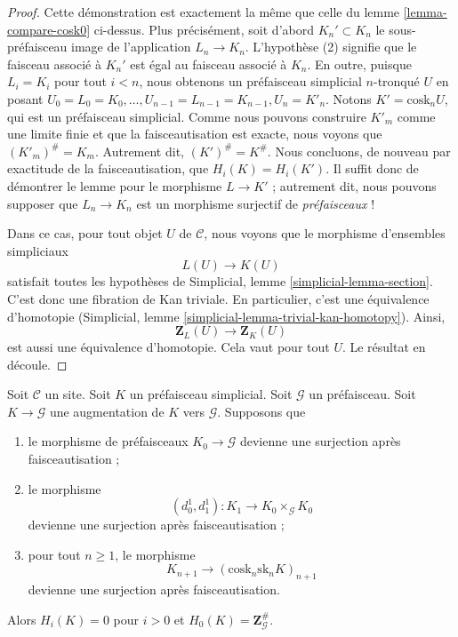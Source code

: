\begin{proof}
Cette démonstration est exactement la même que celle du
lemme \ref{lemma-compare-cosk0} ci-dessus. Plus précisément,
soit d'abord $K_n' \subset K_n$ le sous-préfaisceau
image de l'application $L_n \to K_n$. L'hypothèse
(2) signifie que le faisceau associé à $K_n'$ est égal au
faisceau associé à $K_n$. En outre, puisque $L_i = K_i$
pour tout $i < n$, nous obtenons un préfaisceau simplicial
$n$-tronqué $U$ en posant
$U_0 = L_0 = K_0, \ldots, U_{n - 1} = L_{n - 1} = K_{n - 1}, U_n = K'_n$.
Notons $K' = \text{cosk}_n U$, qui est un préfaisceau simplicial.
Comme nous pouvons construire $K'_m$ comme une limite finie et
que la faisceautisation est exacte, nous voyons que
$(K'_m)^\# = K_m$. Autrement dit, $(K')^\# = K^\#$.
Nous concluons, de nouveau par exactitude de la faisceautisation,
que $H_i(K) = H_i(K')$. Il suffit donc de démontrer le lemme
pour le morphisme $L \to K'$ ; autrement dit, nous pouvons
supposer que $L_n \to K_n$ est un morphisme surjectif
de {\it préfaisceaux} !

\medskip\noindent
Dans ce cas, pour tout objet $U$ de $\mathcal{C}$, nous
voyons que le morphisme d'ensembles simpliciaux
$$
L(U) \longrightarrow K(U)
$$
satisfait toutes les hypothèses de
Simplicial, lemme \ref{simplicial-lemma-section}.
C'est donc une fibration de Kan triviale. En particulier, c'est
une équivalence d'homotopie
(Simplicial, lemme \ref{simplicial-lemma-trivial-kan-homotopy}).
Ainsi,
$$
\mathbf{Z}_L(U) \longrightarrow \mathbf{Z}_K(U)
$$
est aussi une équivalence d'homotopie. Cela vaut pour tout $U$.
Le résultat en découle.
\end{proof}

\begin{lemma}
\label{lemma-acyclic-hypercover-sheaves}
Soit $\mathcal{C}$ un site.
Soit $K$ un préfaisceau simplicial.
Soit $\mathcal{G}$ un préfaisceau.
Soit $K \to \mathcal{G}$ une augmentation de $K$
vers $\mathcal{G}$. Supposons que
\begin{enumerate}
\item le morphisme de préfaisceaux $K_0 \to \mathcal{G}$ devienne
une surjection après faisceautisation ;
\item le morphisme
$$
(d^1_0, d^1_1) :
K_1
\longrightarrow
K_0 \times_\mathcal{G} K_0
$$
devienne une surjection après faisceautisation ;
\item pour tout $n \geq 1$, le morphisme
$$
K_{n + 1} \longrightarrow (\text{cosk}_n \text{sk}_n K)_{n + 1}
$$
devienne une surjection après faisceautisation.
\end{enumerate}
Alors $H_i(K) = 0$ pour $i > 0$ et
$H_0(K) = \mathbf{Z}_\mathcal{G}^\#$.
\end{lemma}

